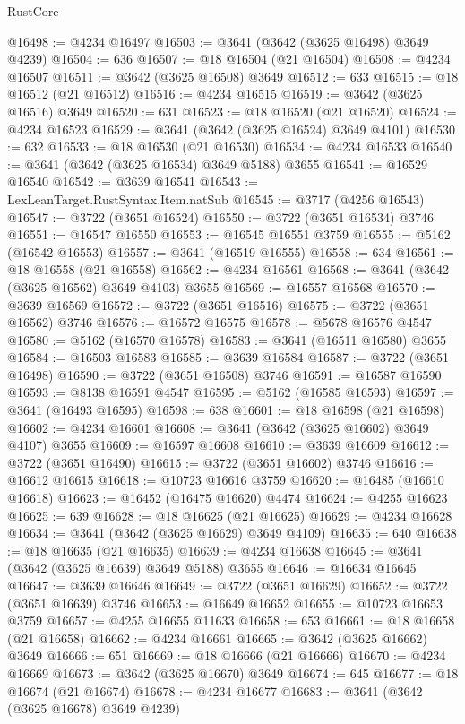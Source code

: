 \begin{lexlean}{RustCore}
\begin{coremodule}
@16498 := @4234 @16497
@16503 := @3641 (@3642 (@3625 @16498) @3649 @4239)
@16504 := 636
@16507 := @18 @16504 (@21 @16504)
@16508 := @4234 @16507
@16511 := @3642 (@3625 @16508) @3649
@16512 := 633
@16515 := @18 @16512 (@21 @16512)
@16516 := @4234 @16515
@16519 := @3642 (@3625 @16516) @3649
@16520 := 631
@16523 := @18 @16520 (@21 @16520)
@16524 := @4234 @16523
@16529 := @3641 (@3642 (@3625 @16524) @3649 @4101)
@16530 := 632
@16533 := @18 @16530 (@21 @16530)
@16534 := @4234 @16533
@16540 := @3641 (@3642 (@3625 @16534) @3649 @5188) @3655
@16541 := @16529 @16540
@16542 := @3639 @16541
@16543 := LexLeanTarget.RustSyntax.Item.natSub
@16545 := @3717 (@4256 @16543)
@16547 := @3722 (@3651 @16524)
@16550 := @3722 (@3651 @16534) @3746
@16551 := @16547 @16550
@16553 := @16545 @16551 @3759
@16555 := @5162 (@16542 @16553)
@16557 := @3641 (@16519 @16555)
@16558 := 634
@16561 := @18 @16558 (@21 @16558)
@16562 := @4234 @16561
@16568 := @3641 (@3642 (@3625 @16562) @3649 @4103) @3655
@16569 := @16557 @16568
@16570 := @3639 @16569
@16572 := @3722 (@3651 @16516)
@16575 := @3722 (@3651 @16562) @3746
@16576 := @16572 @16575
@16578 := @5678 @16576 @4547
@16580 := @5162 (@16570 @16578)
@16583 := @3641 (@16511 @16580) @3655
@16584 := @16503 @16583
@16585 := @3639 @16584
@16587 := @3722 (@3651 @16498)
@16590 := @3722 (@3651 @16508) @3746
@16591 := @16587 @16590
@16593 := @8138 @16591 @4547
@16595 := @5162 (@16585 @16593)
@16597 := @3641 (@16493 @16595)
@16598 := 638
@16601 := @18 @16598 (@21 @16598)
@16602 := @4234 @16601
@16608 := @3641 (@3642 (@3625 @16602) @3649 @4107) @3655
@16609 := @16597 @16608
@16610 := @3639 @16609
@16612 := @3722 (@3651 @16490)
@16615 := @3722 (@3651 @16602) @3746
@16616 := @16612 @16615
@16618 := @10723 @16616 @3759
@16620 := @16485 (@16610 @16618)
@16623 := @16452 (@16475 @16620) @4474
@16624 := @4255 @16623
@16625 := 639
@16628 := @18 @16625 (@21 @16625)
@16629 := @4234 @16628
@16634 := @3641 (@3642 (@3625 @16629) @3649 @4109)
@16635 := 640
@16638 := @18 @16635 (@21 @16635)
@16639 := @4234 @16638
@16645 := @3641 (@3642 (@3625 @16639) @3649 @5188) @3655
@16646 := @16634 @16645
@16647 := @3639 @16646
@16649 := @3722 (@3651 @16629)
@16652 := @3722 (@3651 @16639) @3746
@16653 := @16649 @16652
@16655 := @10723 @16653 @3759
@16657 := @4255 @16655 @11633
@16658 := 653
@16661 := @18 @16658 (@21 @16658)
@16662 := @4234 @16661
@16665 := @3642 (@3625 @16662) @3649
@16666 := 651
@16669 := @18 @16666 (@21 @16666)
@16670 := @4234 @16669
@16673 := @3642 (@3625 @16670) @3649
@16674 := 645
@16677 := @18 @16674 (@21 @16674)
@16678 := @4234 @16677
@16683 := @3641 (@3642 (@3625 @16678) @3649 @4239)

\end{coremodule}
\end{lexlean}
